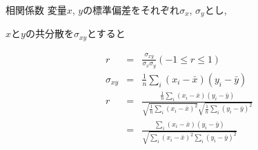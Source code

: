 \documentclass[aspectratio=169, 12pt]{beamer} %
\begin{document}
\begin{frame}{相関係数}
    変量$x$, $y$の標準偏差をそれぞれ$\sigma_x$, $\sigma_y$とし, \par
    $x$と$y$の共分散を$\sigma_{xy}$とすると \par
    \begin{eqnarray*}
        r&=&\frac{\sigma_{xy}}{\sigma_x\sigma_y} (-1\leq r \leq 1) \\
        \sigma_{xy}&=&\frac{1}{n}\sum_i(x_i-\bar{x})(y_i-\bar{y}) \\
        r&=&\frac{\frac{1}{n}\sum_i(x_i-\bar{x})(y_i-\bar{y})}{\sqrt{\frac{1}{n}\sum_i(x_i-\bar{x})^2}\sqrt{\frac{1}{n}\sum_i(y_i-\bar{y})^2}} \\
        &=&\frac{\sum_i(x_i-\bar{x})(y_i-\bar{y})}{\sqrt{\sum_i(x_i-\bar{x})^2\sum_i(y_i-\bar{y})^2}}
    \end{eqnarray*}
\end{frame}
\end{document}
